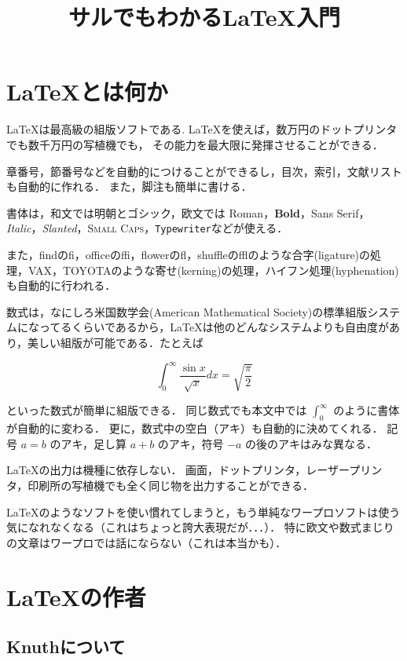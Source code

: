 \documentclass[a4j]{jbook}
\begin{document}
\title{サルでもわかる\LaTeX 入門}
\author{}
\date{}

\maketitle

\section{\LaTeX とは何か}

\LaTeX は最高級の組版ソフトである. 
\LaTeX を使えば，数万円のドットプリンタでも数千万円の写植機でも，
その能力を最大限に発揮させることができる．

章番号，節番号などを自動的につけることができるし，目次，索引，文献リストも自動的に作れる．
また，脚注も簡単に書ける．

書体は，和文では明朝とゴシック，欧文では Roman，\textbf{Bold}，\textsf{Sans Serif}，\textit{Italic}，\textsl{Slanted}，\textsc{Small Caps}，\texttt{Typewriter}などが使える．

また，findのfi，officeのffi，flowerのfl，shuffleのfflのような合字(ligature)の処理，VAX，TOYOTAのような寄せ(kerning)の処理，ハイフン処理(hyphenation)も自動的に行われる．

数式は，なにしろ米国数学会(American Mathematical Society)の標準組版システム\cite{Rate06}になってるくらいであるから，\LaTeX は他のどんなシステムよりも自由度があり，美しい組版が可能である．たとえば

  \[ \int_0^\infty \frac{\sin x}{\sqrt{x}}dx
    = \sqrt{\frac{\pi}{2}} \]

といった数式が簡単に組版できる．
同じ数式でも本文中では $\int_0^\infty$ のように書体が自動的に変わる．
更に，数式中の空白（アキ）も自動的に決めてくれる．
記号 $a=b$ のアキ，足し算 $a+b$ のアキ，符号 $-a$ の後のアキはみな異なる．

\LaTeX の出力は機種に依存しない．
画面，ドットプリンタ，レーザープリンタ，印刷所の写植機でも全く同じ物を出力することができる\cite{HM99}．

\LaTeX のようなソフトを使い慣れてしまうと，もう単純なワープロソフトは使う気になれなくなる（これはちょっと誇大表現だが．．．）．
特に欧文や数式まじりの文章はワープロでは話にならない（これは本当かも）．

\section{\LaTeX の作者}

\subsection{Knuthについて}
\end{document}
